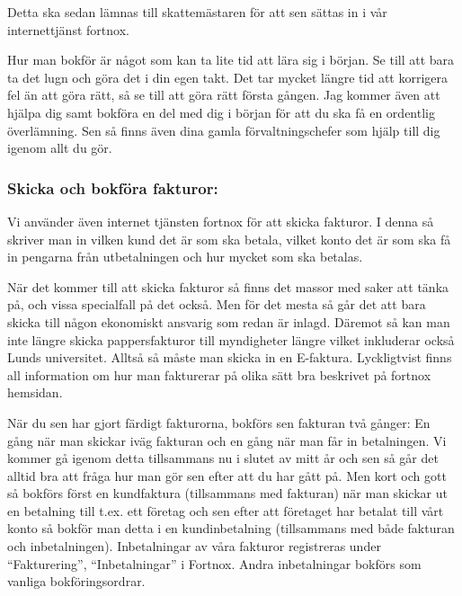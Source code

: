 \documentclass[10pt]{article}
\begin{document}
Detta ska sedan lämnas till skattemästaren för att sen sättas in i vår internettjänst fortnox. \newline

Hur man bokför är något som kan ta lite tid att lära sig i början. Se till att bara ta det lugn och göra det i din egen takt. Det tar mycket längre tid att korrigera fel än att göra rätt, så se till att göra rätt första gången. Jag kommer även att hjälpa dig samt bokföra en del med dig i början för att du ska få en ordentlig överlämning. Sen så finns även dina gamla förvaltningschefer som hjälp till dig igenom allt du gör.

\subsubsection {Skicka och bokföra fakturor: }
Vi använder även internet tjänsten fortnox för att skicka fakturor. I denna så skriver man in vilken kund det är som ska betala, vilket konto det är som ska få in pengarna från utbetalningen och hur mycket som ska betalas. 

När det kommer till att skicka fakturor så finns det massor med saker att tänka på, och vissa specialfall på det också. Men för det mesta så går det att bara skicka till någon ekonomiskt ansvarig som redan är inlagd.
Däremot så kan man inte längre skicka pappersfakturor till myndigheter längre vilket inkluderar också Lunds universitet. Alltså så måste man skicka in en E-faktura. Lyckligtvist finns all information om hur man fakturerar på olika sätt bra beskrivet på fortnox hemsidan.

När du sen har gjort färdigt fakturorna, bokförs sen fakturan två gånger: 
En gång när man skickar iväg fakturan och en gång när man får in betalningen. Vi kommer gå igenom detta tillsammans nu i slutet av mitt år och sen så går det alltid bra att fråga hur man gör sen efter att du har gått på. Men kort och gott så bokförs först en kundfaktura (tillsammans med fakturan) när man skickar ut en betalning till t.ex. ett företag och sen efter att företaget har betalat till vårt konto så bokför man detta i en kundinbetalning (tillsammans med både fakturan och inbetalningen). 
Inbetalningar av våra fakturor registreras under “Fakturering”, “Inbetalningar” i Fortnox. 
Andra inbetalningar bokförs som vanliga bokföringsordrar.
\newline
\end{document}
